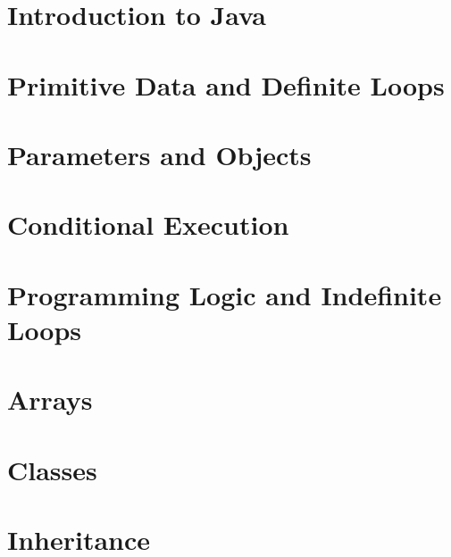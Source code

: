 \section{Introduction to Java}
\section{Primitive Data and Definite Loops}
\section{Parameters and Objects}
\section{Conditional Execution}
\section{Programming Logic and Indefinite Loops}
\section{Arrays}
\section{Classes}
\section{Inheritance}
